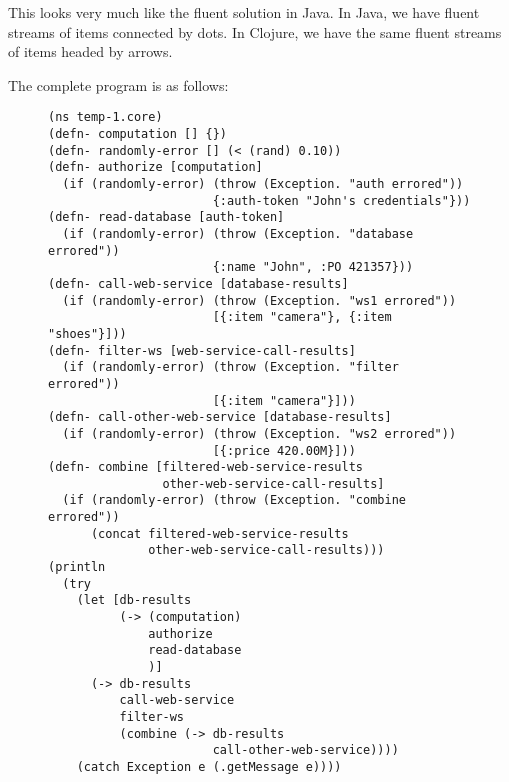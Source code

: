 \documentclass[11pt]{article}
\begin{document}
This looks very much like the fluent solution in Java. In Java, we
have fluent streams of items connected by dots. In Clojure, we have
the same fluent streams of items headed by arrows.

The complete program is as follows:

\begin{figure}[H]
\label{functional-helpers-1}
\begin{verbatim}
(ns temp-1.core)
(defn- computation [] {})
(defn- randomly-error [] (< (rand) 0.10))
(defn- authorize [computation]
  (if (randomly-error) (throw (Exception. "auth errored"))
                       {:auth-token "John's credentials"}))
(defn- read-database [auth-token]
  (if (randomly-error) (throw (Exception. "database errored"))
                       {:name "John", :PO 421357}))
(defn- call-web-service [database-results]
  (if (randomly-error) (throw (Exception. "ws1 errored"))
                       [{:item "camera"}, {:item "shoes"}]))
(defn- filter-ws [web-service-call-results]
  (if (randomly-error) (throw (Exception. "filter errored"))
                       [{:item "camera"}]))
(defn- call-other-web-service [database-results]
  (if (randomly-error) (throw (Exception. "ws2 errored"))
                       [{:price 420.00M}]))
(defn- combine [filtered-web-service-results
                other-web-service-call-results]
  (if (randomly-error) (throw (Exception. "combine errored"))
      (concat filtered-web-service-results
              other-web-service-call-results)))
(println
  (try
    (let [db-results
          (-> (computation)
              authorize
              read-database
              )]
      (-> db-results
          call-web-service
          filter-ws
          (combine (-> db-results
                       call-other-web-service))))
    (catch Exception e (.getMessage e))))
\end{verbatim}
\end{figure}
\end{document}
